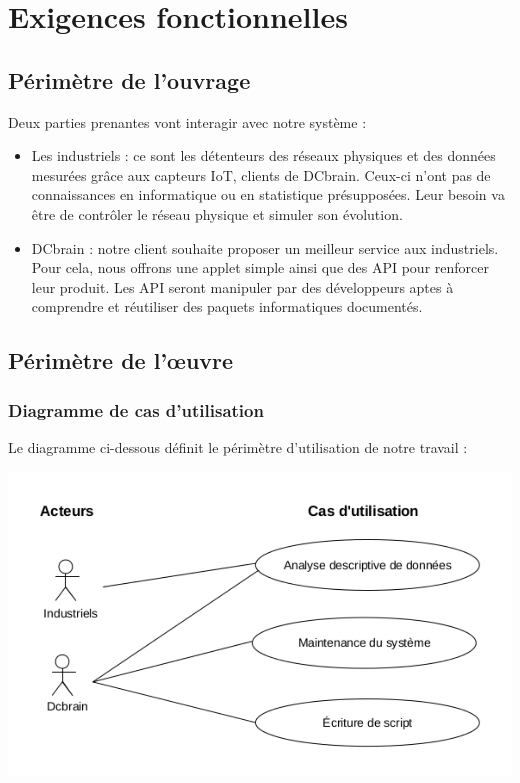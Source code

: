 	\section{Exigences fonctionnelles}
	
		\subsection{Périmètre de l'ouvrage}
			Deux parties prenantes vont interagir avec notre système :
			\begin{itemize}
			\item Les industriels : ce sont les détenteurs des réseaux physiques et des données mesurées grâce aux capteurs IoT, clients de DCbrain. Ceux-ci n'ont pas de connaissances en informatique ou en statistique présupposées. Leur besoin va être de contrôler le réseau physique et simuler son évolution.
			\item DCbrain : notre client souhaite proposer un meilleur service aux industriels. Pour cela, nous offrons une applet simple ainsi que des API pour renforcer leur produit. Les API seront manipuler par des développeurs aptes à comprendre et réutiliser des paquets informatiques documentés.
			\end{itemize}
				
		\subsection{Périmètre de l'œuvre}
		
			\subsubsection{Diagramme de cas d'utilisation}
				Le diagramme ci-dessous définit le périmètre d'utilisation de notre travail :\\
				\begin{center}\includegraphics[scale=0.8]{diagCU.png}\end{center}
				
